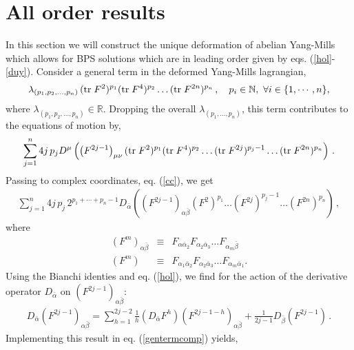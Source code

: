 \documentclass[a4paper,12pt,oneside]{article}
\def\IN{\mathbb{N}}
\def\IR{\mathbb{R}}
\newcommand{\tr}{\mbox{${\rm tr \;}$}}
\begin{document}
\setcounter{equation}{0}
\section{All order results}

In this section we will construct the unique deformation of abelian Yang-Mills
which allows for BPS solutions which are in leading order given by eqs. 
(\ref{hol}-\ref{duy}).
Consider a general term in the deformed Yang-Mills lagrangian,
\begin{eqnarray}
\lambda_{(p_1,p_2,\ldots,p_n)} \, (\tr F^2)^{p_1} (\tr F^4)^{p_2} 
\ldots (\tr F^{2n})^{p_n} \, ,\quad p_i\in\IN,\ \forall i 
\in\{1,\cdots,n\},
\end{eqnarray}
where $\lambda_{(p_1,p_2,\ldots,p_n)}\in\IR$.
Dropping the overall $\lambda_{(p_1,\ldots,p_n)}$, this term contributes 
to the equations of motion by,
\begin{eqnarray}
\label{gentermeom}
\sum_{j=1}^{n} 4 j \, p_j D^{\mu} \left( \left(F^{2j-1}\right)_{\mu\nu}
        (\tr F^2)^{p_1} (\tr F^4)^{p_2} \ldots (\tr F^{2j})^{p_j - 1} 
        \ldots (\tr F^{2n})^{p_n} \right) \, .
\end{eqnarray}
Passing to complex coordinates, eq. (\ref{cc}), we get
\begin{eqnarray}
\label{gentermcomp}
\sum_{j=1}^{n} 4 j \, p_j \, 2^{p_1+\cdots+p_n-1} D_{\bar{\alpha}} 
\left( \left(F^{2j-1}\right)_{\alpha\bar{\beta}}
      (F^2)^{p_1} \ldots (F^{2j})^{p_j-1} \ldots (F^{2n})^{p_n} \right) \, ,
\end{eqnarray}
where
\begin{eqnarray} 
(F^{m})_{\alpha\bar{\beta}} & \equiv& F_{\alpha\bar{\alpha}_2} F_{\alpha_2\bar{\alpha}_3} 
\ldots F_{\alpha_m\bar{\beta}} \nonumber\\
(F^{m}) & \equiv&  F_{\alpha_1\bar{\alpha}_2} F_{\alpha_2\bar{\alpha}_3} 
\ldots F_{\alpha_m\bar{\alpha}_1} . 
\end{eqnarray}
Using the Bianchi identies and eq. (\ref{hol}), we find for the action of the 
derivative operator $D_{\bar{\alpha}}$ on $(F^{2j-1})_{\alpha\bar{\beta}}$:
\begin{eqnarray}
D_{\bar{\alpha}} (F^{2j-1})_{\alpha\bar{\beta}}
 = \sum_{h=1}^{2j-2} \frac{1}{h} \left( D_{\bar{\alpha}} 
F^{h} \right) (F^{2j-1-h})_{\alpha\bar{\beta}}+
\frac{1}{2j-1}D_{\bar\beta}(F^{2j-1})\, .
\end{eqnarray}
Implementing this result in eq. (\ref{gentermcomp}) yields,
\end{document}
